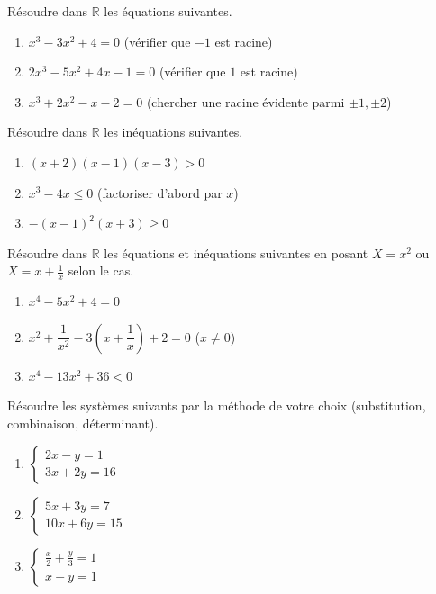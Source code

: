 \documentclass[11pt]{article}
\begin{document}
\begin{exercice}
Résoudre dans $\mathbb{R}$ les équations suivantes.
\begin{enumerate}
    \item $x^3 - 3x^2 + 4 = 0$ \quad (vérifier que $-1$ est racine)
    \item $2x^3 - 5x^2 + 4x - 1 = 0$ \quad (vérifier que $1$ est racine)
    \item $x^3 + 2x^2 - x - 2 = 0$ \quad (chercher une racine évidente parmi $\pm 1, \pm 2$)
\end{enumerate}
\end{exercice}

\begin{exercice}
Résoudre dans $\mathbb{R}$ les inéquations suivantes.
\begin{enumerate}
    \item $(x+2)(x-1)(x-3) > 0$
    \item $x^3 - 4x \le 0$ \quad (factoriser d'abord par $x$)
    \item $-(x-1)^2(x+3) \ge 0$
\end{enumerate}
\end{exercice}

\begin{exercice}
Résoudre dans $\mathbb{R}$ les équations et inéquations suivantes en posant $X = x^2$ ou $X = x + \frac{1}{x}$ selon le cas.
\begin{enumerate}
    \item $x^4 - 5x^2 + 4 = 0$
    \item $x^2 + \dfrac{1}{x^2} - 3\left(x + \dfrac{1}{x}\right) + 2 = 0$ \quad ($x \neq 0$)
    \item $x^4 - 13x^2 + 36 < 0$
\end{enumerate}
\end{exercice}

\begin{exercice}
Résoudre les systèmes suivants par la méthode de votre choix (substitution, combinaison, déterminant).
\begin{enumerate}
    \item $\begin{cases} 2x - y = 1 \\ 3x + 2y = 16 \end{cases}$
    \item $\begin{cases} 5x + 3y = 7 \\ 10x + 6y = 15 \end{cases}$
    \item $\begin{cases} \frac{x}{2} + \frac{y}{3} = 1 \\ x - y = 1 \end{cases}$
\end{enumerate}
\end{exercice}
\end{document}
